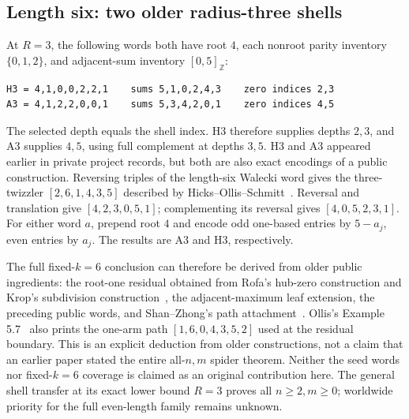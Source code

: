 \documentclass[11pt,a4paper]{article}
\theoremstyle{definition}\newtheorem{definition}[theorem]{Definition}
\theoremstyle{remark}\newtheorem{remark}[theorem]{Remark}
\newcommand{\ints}[2]{[#1,#2]_{\mathbb Z}}
\begin{document}
\subsection{Length six: two older radius-three shells}
At $R=3$, the following words both have root $4$, each nonroot parity
inventory $\{0,1,2\}$, and adjacent-sum inventory $\ints05$:
\begin{verbatim}
H3 = 4,1,0,0,2,2,1    sums 5,1,0,2,4,3    zero indices 2,3
A3 = 4,1,2,2,0,0,1    sums 5,3,4,2,0,1    zero indices 4,5
\end{verbatim}
The selected depth equals the shell index. H3 therefore supplies depths
$2,3$, and A3 supplies $4,5$, using full complement at depths $3,5$.
H3 and A3 appeared earlier in private project records, but both are
also exact encodings of a public construction. Reversing triples of the
length-six Walecki word gives the three-twizzler
$[2,6,1,4,3,5]$ described by Hicks--Ollis--Schmitt~\cite{hos}.
Reversal and translation give $[4,2,3,0,5,1]$; complementing its
reversal gives $[4,0,5,2,3,1]$. For either word $a$, prepend root $4$
and encode odd one-based entries by $5-a_j$, even entries by $a_j$.
The results are A3 and H3, respectively.

The full fixed-$k=6$ conclusion can therefore be derived from older
public ingredients: the root-one residual obtained from Rofa's hub-zero
construction and Krop's subdivision construction~\cite{rofa,krop},
the adjacent-maximum leaf extension, the preceding public words, and
Shan--Zhong's path attachment~\cite[Theorem 2]{sz}. Ollis's
Example 5.7~\cite{ollis} also prints the one-arm path
$[1,6,0,4,3,5,2]$ used at the residual boundary.
This is an explicit deduction from older constructions, not a claim
that an earlier paper stated the entire all-$n,m$ spider theorem.
Neither the seed words nor fixed-$k=6$ coverage is claimed as an original
contribution here. The general shell transfer at its exact
lower bound $R=3$ proves all $n\ge2,m\ge0$; worldwide priority for the
full even-length family remains unknown.
\end{document}
